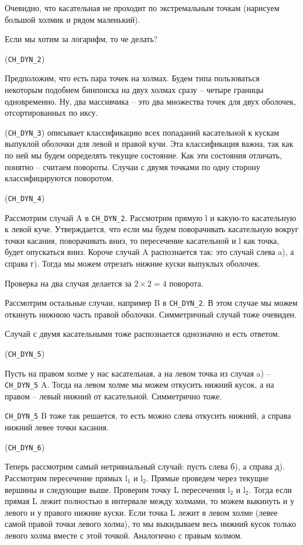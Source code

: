 \documentclass[11pt]{article}
\begin{document}
Очевидно, что касательная не проходит по экстремальным точкам
(нарисуем большой холмик и рядом маленький).

Если мы хотим за логарифм, то че делать?

(\verb~CH_DYN_2~)

Предположим, что есть пара точек на холмах. Будем типа пользоваться
некоторым подобием бинпоиска на двух холмах сразу -- четыре границы
одновременно. Ну, два массивчика -- это два множества точек для двух
оболочек, отсортированных по иксу.

(\verb~CH_DYN_3~) описывает классификацию всех попаданий касательной к кускам
выпуклой оболочки для левой и правой кучи. Эта классификация важна,
так как по ней мы будем определять текущее состояние. Как эти
состояния отличать, понятно -- считаем повороты. Случаи с двумя
точками по одну сторону классифицируются поворотом.

(\verb~CH_DYN_4~)

Рассмотрим случай A в \verb~CH_DYN_2~. Рассмотрим прямую l и какую-то
касательную к левой куче. Утверждается, что если мы будем
поворачивать касательную вокруг точки касания, поворачивать вниз, то
пересечение касательной и l как точка, будет опускаться вниз.
Короче случай A распознается так: это случай слева a), а справа
г). Тогда мы можем отрезать нижние куски выпуклых оболочек.

Проверка на два случая делается за $2\times2 = 4$ поворота.

Рассмотрим остальные случаи, например B в \verb~CH_DYN_2~. В этом случае мы
можем откинуть нижнюю часть правой оболочки. Симметричный случай
тоже очевиден.

Случай с двумя касательными тоже распознается однозначно и есть
ответом.

(\verb~CH_DYN_5~)

Пусть на правом холме у нас касательная, а на левом точка из случая
a) -- \verb~CH_DYN_5~ A. Тогда на левом холме мы можем откусить нижний
кусок, а на правом -- левый нижний от касательной. Симметрично тоже.

\verb~CH_DYN_5~ B тоже так решается, то есть можно слева откусить нижний, а
справа нижний левее точки касания.

(\verb~CH_DYN_6~)

Теперь рассмотрим самый нетривиальный случай: пусть слева б), а
справа д). Рассмотрим пересечение прямых l$_{\text{1}}$ и l$_{\text{2}}$. Прямые проведем
через текущие вершины и следующие выше. Проверим точку L пересечения
l$_{\text{2}}$ и l$_{\text{2}}$. Тогда если прямая L лежит полностью в интервале между
холмами, то можем выкинуть и у левого и у правого нижние куски. Если
точка L лежит в левом холме (левее самой правой точки левого холма),
то мы выкидываем весь нижний кусок только левого холма вместе с этой
точкой. Аналогично с правым холмом.
\end{document}
